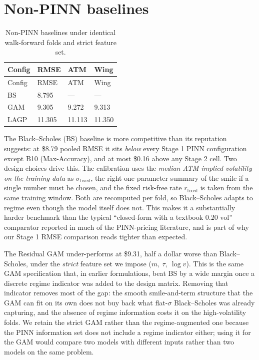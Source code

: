 \documentclass[
  11pt,
]{article}
\begin{document}
\section{Non-PINN baselines}\label{sec-baselines}

\begin{longtable}[]{@{}llll@{}}
\caption{Non-PINN baselines under identical walk-forward folds and
strict feature set.}\label{tbl-baselines}\tabularnewline
\toprule\noalign{}
Config & RMSE & ATM & Wing \\
\midrule\noalign{}
\endfirsthead
\toprule\noalign{}
Config & RMSE & ATM & Wing \\
\midrule\noalign{}
\endhead
\bottomrule\noalign{}
\endlastfoot
BS & 8.795 & --- & --- \\
GAM & 9.305 & 9.272 & 9.313 \\
LAGP & 11.305 & 11.113 & 11.350 \\
\end{longtable}

The Black--Scholes (BS) baseline is more competitive than its reputation
suggests: at \$8.79 pooled RMSE it sits \emph{below} every Stage 1 PINN
configuration except B10 (Max-Accuracy), and at most \$0.16 above any
Stage 2 cell. Two design choices drive this. The calibration uses the
\emph{median ATM implied volatility on the training data} as
\(\sigma_\mathrm{fixed}\), the right one-parameter summary of the smile
if a single number must be chosen, and the fixed risk-free rate
\(r_\mathrm{fixed}\) is taken from the same training window. Both are
recomputed per fold, so Black--Scholes adapts to regime even though the
model itself does not. This makes it a substantially harder benchmark
than the typical ``closed-form with a textbook 0.20 vol'' comparator
reported in much of the PINN-pricing literature, and is part of why our
Stage 1 RMSE comparison reads tighter than expected.

The Residual GAM under-performs at \$9.31, half a dollar worse than
Black--Scholes, under the \emph{strict} feature set we impose
(\(m,\ \tau,\ \log v\)). This is the same GAM specification that, in
earlier formulations, beat BS by a wide margin once a discrete regime
indicator was added to the design matrix. Removing that indicator
removes most of the gap: the smooth smile-and-term structure that the
GAM can fit on its own does not buy back what flat-\(\sigma\)
Black--Scholes was already capturing, and the absence of regime
information costs it on the high-volatility folds. We retain the strict
GAM rather than the regime-augmented one because the PINN information
set does not include a regime indicator either; using it for the GAM
would compare two models with different inputs rather than two models on
the same problem.
\end{document}
